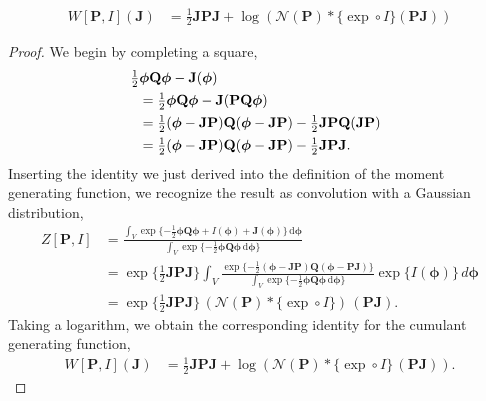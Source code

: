 \documentclass[10pt,a4paper]{amsart}
\begin{document}
\begin{thm} \label{GenAsConvo}
  \begin{align}
    W[\mathbf{P}, I](\mathbf{J})
    &= \tfrac{1}{2} \mathbf{J}\mathbf{P}\mathbf{J}  +
    \log (\mathcal{N}(\mathbf{P}) * \{\exp \circ I\} (\mathbf{P}\mathbf{J}))
  \end{align}
\end{thm}

\begin{proof}
  We begin by completing a square,
  \begin{align}
    &\hskip -6pt \tfrac{1}{2} \boldsymbol{\phi}
    \mathbf{Q} \boldsymbol{\phi}
    - \mathbf{J} (\boldsymbol{\phi}) \\
    &= \tfrac{1}{2} \boldsymbol{\phi}
    \mathbf{Q} \boldsymbol{\phi}
    - \mathbf{J} (\mathbf{P} \mathbf{Q}  \boldsymbol{\phi}) \\
    &= \tfrac{1}{2} (\boldsymbol{\phi} - \mathbf{J}\mathbf{P})
    \mathbf{Q} (\boldsymbol{\phi} - \mathbf{J}\mathbf{P})
    - \tfrac{1}{2}\mathbf{J}\mathbf{P}
    \mathbf{Q} (\mathbf{J}\mathbf{P}) \\
    &= \tfrac{1}{2} (\boldsymbol{\phi} - \mathbf{J}\mathbf{P})
    \mathbf{Q} (\boldsymbol{\phi} - \mathbf{J}\mathbf{P})
    - \tfrac{1}{2}\mathbf{J}\mathbf{P}\mathbf{J} .
  \end{align}
  Inserting the identity we just derived into the definition of the
  moment generating function, we recognize the result as
  convolution with a Gaussian distribution,
  \begin{align}
    Z[\mathbf{P}, I]
    &= \frac{\int_{V} \exp \{-\tfrac{1}{2} \boldsymbol{\phi}
    \mathbf{Q} \boldsymbol{\phi}
    + I (\boldsymbol{\phi}) + \mathbf{J}(\boldsymbol{\phi})\} \,
    \mathrm{d} \boldsymbol{\phi}}
    {\int_{V} \exp \{-\tfrac{1}{2} \boldsymbol{\phi}
    \mathbf{Q} \boldsymbol{\phi}
    \, \mathrm{d} \boldsymbol{\phi}\}} \\
    &= \exp \{\tfrac{1}{2} \mathbf{J}\mathbf{P}\mathbf{J} \}  \int_{V} \frac{\exp \{-\tfrac{1}{2}
    (\boldsymbol{\phi} - \mathbf{J}\mathbf{P})
    \mathbf{Q} (\boldsymbol{\phi} - \mathbf{P}\mathbf{J})\}}{\int_{V} \exp \{-\tfrac{1}{2} \boldsymbol{\phi}
    \mathbf{Q} \boldsymbol{\phi}
    \, \mathrm{d} \boldsymbol{\phi}\}}
    \exp \{I (\boldsymbol{\phi})\} \, d\boldsymbol{\phi} \\
    &= \exp \{\tfrac{1}{2} \mathbf{J}\mathbf{P}\mathbf{J} \} \,
    (\mathcal{N}(\mathbf{P}) * \{\exp \circ I\}) \, (\mathbf{P}\mathbf{J}).
  \end{align}
  Taking a logarithm, we obtain the corresponding identity for the
  cumulant generating function,
  \begin{align}
    W[\mathbf{P}, I](\mathbf{J})
    &= \tfrac{1}{2} \mathbf{J}\mathbf{P}\mathbf{J}  +
    \log (\mathcal{N}(\mathbf{P}) * \{\exp \circ I\}
    \, (\mathbf{P}\mathbf{J})).
  \end{align}
\end{proof} 
\end{document}
